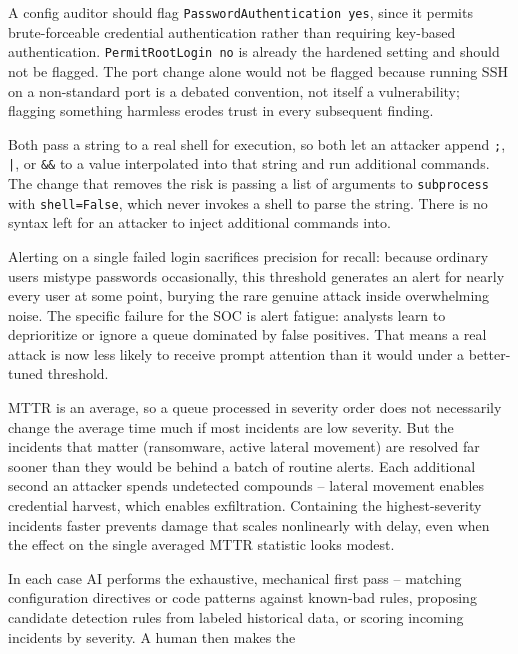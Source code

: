 \begin{answerkey}
\item A config auditor should flag \texttt{PasswordAuthentication yes}, since it permits
brute-forceable credential authentication rather than requiring key-based authentication.
\texttt{PermitRootLogin no} is already the hardened setting and should not be flagged. The port
change alone would not be flagged because running SSH on a non-standard port is a debated
convention, not itself a vulnerability; flagging something harmless erodes trust in every
subsequent finding.
\item Both pass a string to a real shell for execution, so both let an attacker append \texttt{;},
\texttt{|}, or \texttt{\&\&} to a value interpolated into that string and run additional commands.
The change that removes the risk is passing a list of arguments to \texttt{subprocess} with
\texttt{shell=False}, which never invokes a shell to parse the string. There is no syntax left for
an attacker to inject additional commands into.
\item Alerting on a single failed login sacrifices precision for recall: because ordinary users
mistype passwords occasionally, this threshold generates an alert for nearly every user at some
point, burying the rare genuine attack inside overwhelming noise. The specific failure for the SOC
is alert fatigue: analysts learn to deprioritize or ignore a queue dominated by false positives.
That means a real attack is now less likely to receive prompt attention than it would under a
better-tuned threshold.
\item MTTR is an average, so a queue processed in severity order does not necessarily change the
average time much if most incidents are low severity. But the incidents that matter (ransomware,
active lateral movement) are resolved far sooner than they would be behind a batch of routine
alerts. Each additional second an attacker spends undetected compounds -- lateral movement enables
credential harvest, which enables exfiltration. Containing the highest-severity incidents faster
prevents damage that scales nonlinearly with delay, even when the effect on the single averaged
MTTR statistic looks modest.
\item In each case AI performs the exhaustive, mechanical first pass -- matching configuration
directives or code patterns against known-bad rules, proposing candidate detection rules from
labeled historical data, or scoring incoming incidents by severity. A human then makes the

\end{answerkey}

